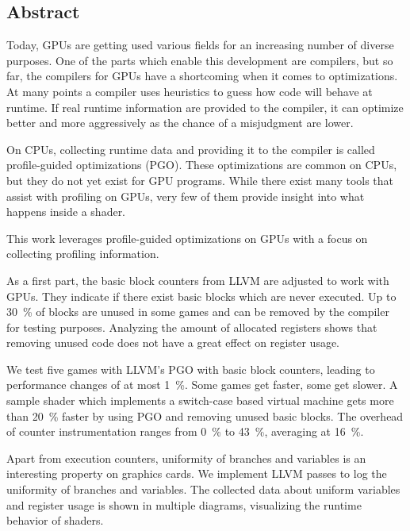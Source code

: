 \newpage
\vspace*{3.5cm}
\begin{center}
\begin{minipage}{12.5cm}
\section*{Abstract}
Today, GPUs are getting used various fields for an increasing number of diverse purposes.
One of the parts which enable this development are compilers, but so far, the compilers for GPUs have a shortcoming when it comes to optimizations.
At many points a compiler uses heuristics to guess how code will behave at runtime.
If real runtime information are provided to the compiler, it can optimize better and more aggressively as the chance of a misjudgment are lower.

On CPUs, collecting runtime data and providing it to the compiler is called profile-guided optimizations (PGO).
These optimizations are common on CPUs, but they do not yet exist for GPU programs.
While there exist many tools that assist with profiling on GPUs, very few of them provide insight into what happens inside a shader.

This work leverages profile-guided optimizations on GPUs with a focus on collecting profiling information.

As a first part, the basic block counters from LLVM are adjusted to work with GPUs.
They indicate if there exist basic blocks which are never executed.
Up to \SI{30}{\percent} of blocks are unused in some games and can be removed by the compiler for testing purposes.
Analyzing the amount of allocated registers shows that removing unused code does not have a great effect on register usage.

We test five games with LLVM's PGO with basic block counters, leading to performance changes of at most \SI{1}{\percent}.
Some games get faster, some get slower.
A sample shader which implements a switch-case based virtual machine gets more than \SI{20}{\percent} faster by using PGO and removing unused basic blocks.
The overhead of counter instrumentation ranges from \SI{0}{\percent} to \SI{43}{\percent}, averaging at \SI{16}{\percent}.

Apart from execution counters, uniformity of branches and variables is an interesting property on graphics cards.
We implement LLVM passes to log the uniformity of branches and variables.
The collected data about uniform variables and register usage is shown in multiple diagrams, visualizing the runtime behavior of shaders.

\end{minipage}
\end{center}



